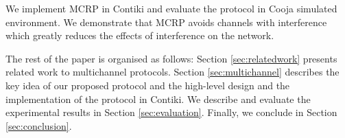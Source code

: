 


We implement MCRP in Contiki and evaluate the protocol in Cooja simulated environment. 
We demonstrate that MCRP avoids channels with interference which greatly reduces the effects of interference on the network.

The rest of the paper is organised as follows: Section \ref{sec:relatedwork} presents related work to multichannel protocols. Section \ref{sec:multichannel} describes the key idea of our proposed protocol and the high-level design and the implementation of the protocol in Contiki. We describe and evaluate the experimental results in Section \ref{sec:evaluation}. Finally, we conclude in Section \ref{sec:conclusion}.